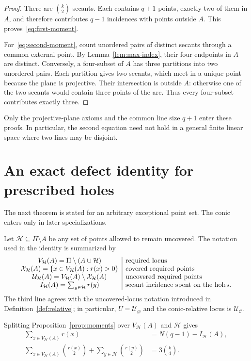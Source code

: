 \documentclass[11pt]{article}
\theoremstyle{definition}
\theoremstyle{remark}
\newcommand{\cC}{\mathcal{C}}
\newcommand{\cH}{\mathcal{H}}
\newcommand{\cU}{\mathcal{U}}
\newcommand{\cX}{\mathcal{X}}
\newcommand{\IH}{I_{\cH}}
\begin{document}
\begin{proof}
There are $\binom{k}{2}$ secants.  Each contains $q+1$ points, exactly two
of them in $A$, and therefore contributes $q-1$ incidences with points
outside $A$.  This proves~\eqref{eq:first-moment}.

For~\eqref{eq:second-moment}, count unordered pairs of distinct secants
through a common external point.  By Lemma~\ref{lem:max-index}, their four
endpoints in $A$ are distinct.  Conversely, a four-subset of $A$ has three
partitions into two unordered pairs.  Each partition gives two secants,
which meet in a unique point because the plane is projective.  Their
intersection is outside $A$: otherwise one of the two secants would contain
three points of the arc.  Thus every four-subset contributes exactly three.
\end{proof}

Only the projective-plane axioms and the common line size $q+1$ enter these
proofs.  In particular, the second equation need not hold in a general
finite linear space where two lines may be disjoint.

\section{An exact defect identity for prescribed holes}
\label{sec:defect}

The next theorem is stated for an arbitrary exceptional point set.  The
conic enters only in later specializations.

Let $\cH\subseteq\Pi\setminus A$ be any set of points allowed to remain
uncovered.  The notation used in the identity is summarized by
\[
\begin{array}{c|l}
V_{\cH}(A)=\Pi\setminus(A\cup\cH)&\text{required locus}\cr
\cX_{\cH}(A)=\{x\in V_{\cH}(A):r(x)>0\}&\text{covered required points}\cr
\cU_{\cH}(A)=V_{\cH}(A)\setminus\cX_{\cH}(A)&\text{uncovered required points}\cr
\IH(A)=\sum_{y\in\cH}r(y)&\text{secant incidence spent on the holes.}
\end{array}
\]
The third line agrees with the uncovered-locus notation introduced in
Definition~\ref{def:relative}; in particular, $U=\cU_{\varnothing}$ and the
conic-relative locus is $\cU_{\cC}$.

Splitting Proposition~\ref{prop:moments} over $V_{\cH}(A)$ and $\cH$ gives
\begin{align}
 \sum_{x\in V_{\cH}(A)}r(x)
   &=N(q-1)-\IH(A), \label{eq:split-first}\\
 \sum_{x\in V_{\cH}(A)}\binom{r(x)}2
 +\sum_{y\in\cH}\binom{r(y)}2
   &=3\binom{k}{4}. \label{eq:split-second}
\end{align}
\end{document}
